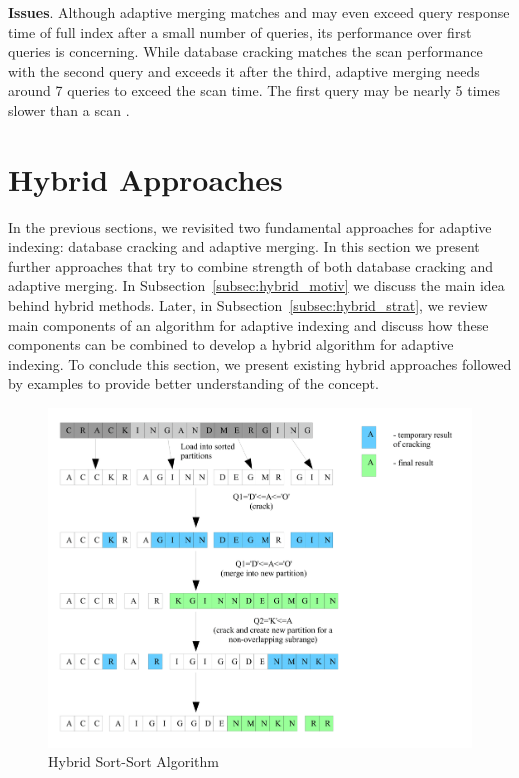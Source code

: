 \documentclass[10pt, conference, compsocconf]{IEEEtran}
\begin{document}
\textbf{Issues}. Although adaptive merging matches and may even exceed query response time of full index after a small number of queries, its performance over first queries is concerning. While database cracking matches the scan performance with the second query and exceeds it after the third, adaptive merging needs around 7 queries to exceed the scan time. The first query may be nearly 5 times slower than a scan \cite{hybrid}.

\section{Hybrid Approaches}
\label{sec:hybrid}
In the previous sections, we revisited two fundamental approaches for adaptive indexing: database cracking and adaptive merging. In this section we present further approaches that try to combine strength of both database cracking and adaptive merging. In Subsection~\ref{subsec:hybrid_motiv} we discuss the main idea behind hybrid methods. Later, in Subsection~\ref{subsec:hybrid_strat}, we review main components of an algorithm for adaptive indexing and discuss how these components can be combined to develop a hybrid algorithm for adaptive indexing. To conclude this section, we present existing hybrid approaches followed by examples to provide better understanding of the concept.

\begin{figure}[h]
\centering
\includegraphics[width=\columnwidth]{hsc.png}
\caption{Hybrid Sort-Sort Algorithm}
\end{figure}
\end{document}
